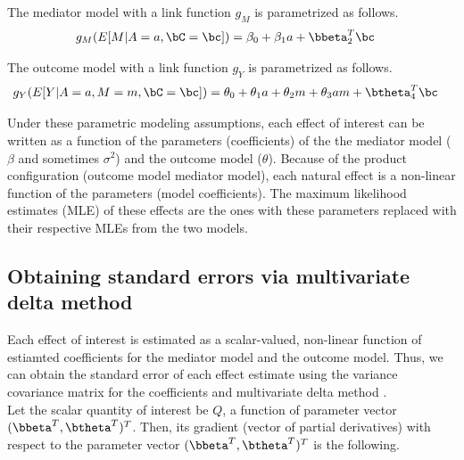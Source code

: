\documentclass[dvipdfmx,10pt]{article}
\begin{document}
The mediator model with a link function \(g_{M}\) is parametrized as follows.
\begin{align*}
  g_{M}(E[M|A=a,\bC=\bc]) &= \beta_{0} + \beta_{1}a + \bbeta_{2}^{T}\bc
\end{align*}

The outcome model with a link function \(g_{Y}\) is parametrized as follows.
\begin{align*}
  g_{Y}(E[Y|A=a,M=m,\bC=\bc]) &= \theta_{0} + \theta_{1}a + \theta_{2}m + \theta_{3}am + \btheta_{4}^{T}\bc
\end{align*}

Under these parametric modeling assumptions, each effect of interest can be written as a function of the parameters (coefficients) of the the mediator model (\(\beta\) and sometimes \(\sigma^{2}\)) and the outcome model (\(\theta\)). Because of the product configuration (outcome model \texttimes{} mediator model), each natural effect is a non-linear function of the parameters (model coefficients). The maximum likelihood estimates (MLE) of these effects are the ones with these parameters replaced with their respective MLEs from the two models.

\subsection{Obtaining standard errors via multivariate delta method}
\label{sec:org6f2498b}

Each effect of interest is estimated as a scalar-valued, non-linear function of estiamted coefficients for the mediator model and the outcome model. Thus, we can obtain the standard error of each effect estimate using the variance covariance matrix for the coefficients and multivariate delta method \cite{hoefWhoInventedDelta2012}.\\

Let the scalar quantity of interest be \(Q\), a function of parameter vector \((\bbeta^{T},\btheta^{T})^{T}\). Then, its gradient (vector of partial derivatives) with respect to the parameter vector \((\bbeta^{T},\btheta^{T})^{T}\) is the following.\\
\end{document}
